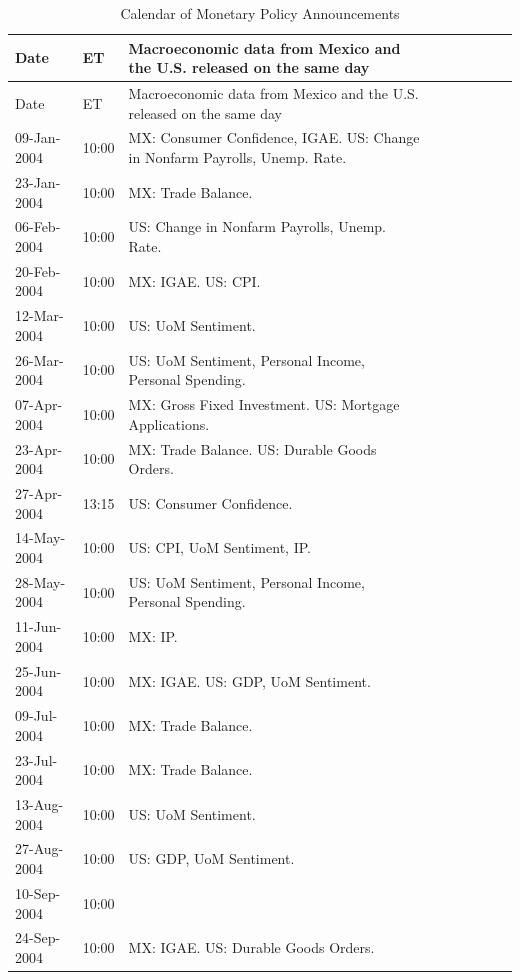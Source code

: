 \documentclass[a4paper,12pt]{article} 		%
\begin{document}
\clearpage
\renewcommand{\thetable}{\ref{sec:calendar}\arabic{table}}
\setcounter{table}{0}
\begin{tiny}
	\begin{center}
		\begin{longtable}{p{1.8cm}p{1cm}p{11.7cm}p{1.8cm}p{1cm}p{11.7cm}p{1.8cm}p{1cm}p{11.7cm}}
			\caption{Calendar of Monetary Policy Announcements}
			\label{tab:calendar}
			\endfirsthead
			\toprule
			Date & ET & Macroeconomic data from Mexico and the U.S. released on the same day \\
			\midrule
			\endhead
			\bottomrule 
			\endfoot
			\endlastfoot
			\toprule
			Date & ET & Macroeconomic data from Mexico and the U.S. released on the same day \\
			\midrule
			09-Jan-2004 & 10:00 & MX: Consumer Confidence, IGAE. US: Change in Nonfarm Payrolls, Unemp. Rate. \\
			23-Jan-2004 & 10:00 & MX: Trade Balance. \\
			06-Feb-2004 & 10:00 & US: Change in Nonfarm Payrolls, Unemp. Rate. \\
			20-Feb-2004 & 10:00 & MX: IGAE. US: CPI. \\
			12-Mar-2004 & 10:00 & US: UoM Sentiment. \\
			26-Mar-2004 & 10:00 & US: UoM Sentiment, Personal Income, Personal Spending. \\
			07-Apr-2004 & 10:00 & MX: Gross Fixed Investment. US: Mortgage Applications. \\
			23-Apr-2004 & 10:00 & MX: Trade Balance. US: Durable Goods Orders. \\
			27-Apr-2004 & 13:15 & US: Consumer Confidence. \\
			14-May-2004 & 10:00 & US: CPI, UoM Sentiment, IP. \\
			28-May-2004 & 10:00 & US: UoM Sentiment, Personal Income, Personal Spending. \\
			11-Jun-2004 & 10:00 & MX: IP. \\
			25-Jun-2004 & 10:00 & MX: IGAE. US: GDP, UoM Sentiment. \\
			09-Jul-2004 & 10:00 & MX: Trade Balance. \\
			23-Jul-2004 & 10:00 & MX: Trade Balance. \\
			13-Aug-2004 & 10:00 & US: UoM Sentiment. \\
			27-Aug-2004 & 10:00 & US: GDP, UoM Sentiment. \\
			10-Sep-2004 & 10:00 &  \\
			24-Sep-2004 & 10:00 & MX: IGAE. US: Durable Goods Orders. \\

\end{longtable}
\end{center}
\end{tiny}
\end{document}
